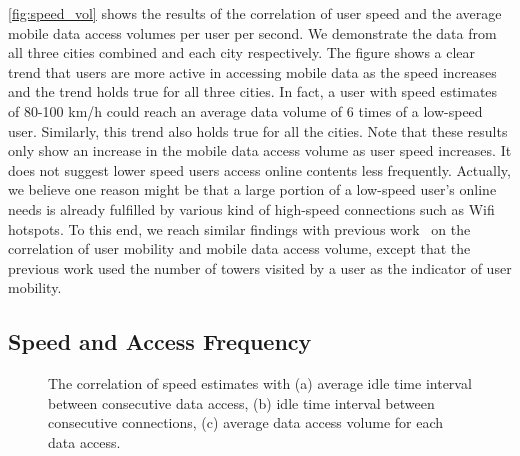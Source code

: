 \autoref{fig:speed_vol} shows the results of the correlation of user speed and the average mobile data access volumes per user per second. We demonstrate the data from all three cities combined and each city respectively. The figure shows a clear trend that users are more active in accessing mobile data as the speed increases and the trend holds true for all three cities. In fact, a user with speed estimates of 80-100 km/h could reach an average data volume of 6 times of a low-speed user. Similarly, this trend also holds true for all the cities. Note that these results only show an increase in the mobile data access volume as user speed increases. It does not suggest lower speed users access online contents less frequently. Actually, we believe one reason might be that a large portion of a low-speed user's online needs is already fulfilled by various kind of high-speed connections such as Wifi hotspots. To this end, we reach similar findings with previous work~\cite{yang2015characterizing} on the correlation of user mobility and mobile data access volume, except that the previous work used the number of towers visited by a user as the indicator of user mobility.

\subsection{Speed and Access Frequency}

\begin{figure}[h]
\centering
{}
\caption{The correlation of speed estimates with (a) average idle time interval between consecutive data access, (b) idle time interval between consecutive connections, (c) average data access volume for each data access.}
\label{fig:speed_corr}
\end{figure}

